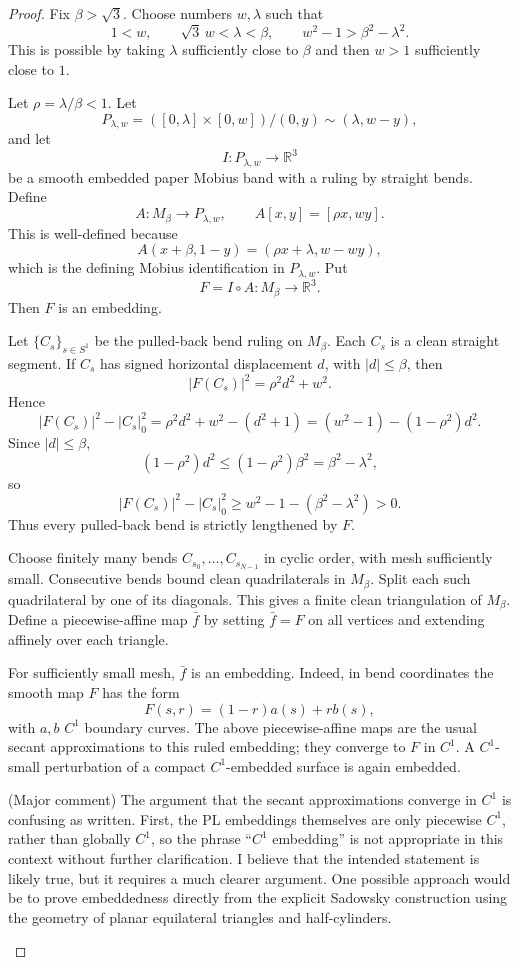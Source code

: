 \documentclass[12pt]{article}
\newcommand{\R}{\mathbb R}
\newcommand{\review}[1]{\begin{reviewbox}#1\end{reviewbox}}
\begin{document}
\begin{proof}
Fix \(\beta>\sqrt3\).  Choose numbers \(w,\lambda\) such that
\[
1<w,\qquad \sqrt3\,w<\lambda<\beta,\qquad
w^2-1>\beta^2-\lambda^2.
\]
This is possible by taking \(\lambda\) sufficiently close to \(\beta\) and then \(w>1\) sufficiently close to \(1\).

Let \(\rho=\lambda/\beta<1\).  Let
\[
P_{\lambda,w}=([0,\lambda]\times[0,w])/(0,y)\sim(\lambda,w-y),
\]
and let
\[
I:P_{\lambda,w}\longrightarrow \R^3
\]
be a smooth embedded paper Mobius band with a ruling by straight bends.  Define
\[
A:M_\beta\longrightarrow P_{\lambda,w},\qquad A[x,y]=[\rho x,wy].
\]
This is well-defined because
\[
A(x+\beta,1-y)=(\rho x+\lambda,w-wy),
\]
which is the defining Mobius identification in \(P_{\lambda,w}\).  Put
\[
F=I\circ A:M_\beta\longrightarrow \R^3.
\]
Then \(F\) is an embedding.

Let \(\{C_s\}_{s\in S^1}\) be the pulled-back bend ruling on \(M_\beta\).  Each \(C_s\) is a clean straight segment.  If \(C_s\) has signed horizontal displacement \(d\), with \(|d|\le \beta\), then
\[
|F(C_s)|^2=\rho^2d^2+w^2.
\]
Hence
\[
|F(C_s)|^2-|C_s|_0^2
=\rho^2d^2+w^2-(d^2+1)
=(w^2-1)-(1-\rho^2)d^2.
\]
Since \(|d|\le\beta\),
\[
(1-\rho^2)d^2\le (1-\rho^2)\beta^2=\beta^2-\lambda^2,
\]
so
\[
|F(C_s)|^2-|C_s|_0^2\ge w^2-1-(\beta^2-\lambda^2)>0. \tag{3}
\]
Thus every pulled-back bend is strictly lengthened by \(F\).

Choose finitely many bends \(C_{s_0},\dots,C_{s_{N-1}}\) in cyclic order, with mesh sufficiently small.  Consecutive bends bound clean quadrilaterals in \(M_\beta\).  Split each such quadrilateral by one of its diagonals.  This gives a finite clean triangulation of \(M_\beta\).  Define a piecewise-affine map \(\bar f\) by setting \(\bar f=F\) on all vertices and extending affinely over each triangle.

For sufficiently small mesh, \(\bar f\) is an embedding.  Indeed, in bend coordinates the smooth map \(F\) has the form
\[
F(s,r)=(1-r)a(s)+r b(s),
\]
with \(a,b\) \(C^1\) boundary curves.  The above piecewise-affine maps are the usual secant approximations to this ruled embedding; they converge to \(F\) in \(C^1\).  A \(C^1\)-small perturbation of a compact \(C^1\)-embedded surface is again embedded.

\review{(Major comment) The argument that the secant approximations converge in $C^1$ is confusing as written. First, the PL embeddings themselves are only piecewise $C^1$, rather than globally $C^1$, so the phrase ``$C^1$ embedding'' is not appropriate in this context without further clarification. I believe that the intended statement is likely true, but it requires a much clearer argument. One possible approach would be to prove embeddedness directly from the explicit Sadowsky construction using the geometry of planar equilateral triangles and half-cylinders.}


\end{proof}
\end{document}
